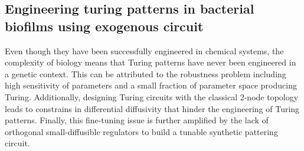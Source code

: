 \subsection{Engineering turing patterns in bacterial biofilms using exogenous circuit }
Even though they have been successfully engineered in chemical systems, the complexity of biology means that Turing patterns have never been engineered in a genetic context.
This can be attributed to the robustness problem including high sensitivity of parameters and a small fraction of parameter space producing Turing.
Additionally, designing Turing circuits with the classical 2-node topology leads to constrains in differential diffusivity that hinder the engineering of Turing patterns.
Finally, this fine-tuning issue is further amplified by the lack of orthogonal small-diffusible regulators to build a tunable synthetic pattering circuit.

